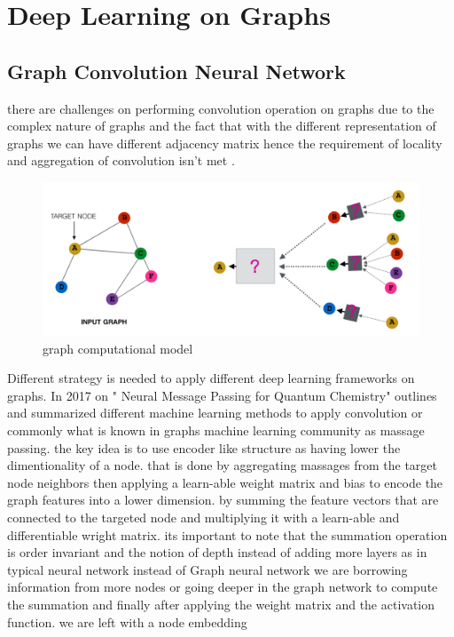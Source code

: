 \documentclass[10pt,twocolumn,letterpaper]{article}
\begin{document}
\section{Deep Learning on Graphs}
\subsection{Graph Convolution Neural Network}

there are challenges on performing convolution operation on graphs due to the complex nature of graphs and the fact that with the different representation of graphs we can have different adjacency matrix hence the requirement of locality and aggregation of convolution isn't met \cite{Kipf2017}. 


\begin{figure}[h!]
  \includegraphics[width=\linewidth]{graph.png}
  \caption{graph computational model}
  \label{fig:graph}
\end{figure}


Different strategy is needed to apply different deep learning frameworks on graphs. In 2017 on " Neural Message Passing for Quantum Chemistry" \cite{Gilmer2017} outlines and summarized different machine learning methods to apply convolution or commonly what is known in graphs machine learning community as massage passing. the key idea is to use encoder like structure as having lower the dimentionality of a node. that is done by aggregating massages from the target node neighbors then applying a learn-able weight matrix and bias to encode the graph features into a lower dimension. by summing the feature vectors that are connected to the targeted node and multiplying it with a learn-able and differentiable wright matrix. its important to note that the summation operation is order invariant and the notion of depth instead of adding more layers as in typical neural network instead of Graph neural network we are borrowing information from more nodes or going deeper in the graph network to compute the summation and finally after applying the weight matrix and the activation function. we are left with a node embedding 
\end{document}
